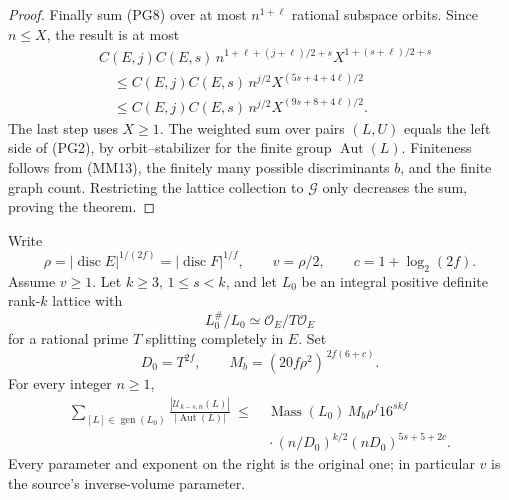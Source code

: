 \begin{proof}
Finally sum (PG8) over at most \(n^{1+\ell}\) rational
subspace orbits.  Since \(n\leq X\), the result is at most
\[
 \begin{split}
 &C(E,j)C(E,s)\,
     n^{1+\ell+(j+\ell)/2+s}
     X^{1+(s+\ell)/2+s}\\
 &\quad\leq C(E,j)C(E,s)\,
               n^{j/2}X^{(5s+4+4\ell)/2}\\
 &\quad\leq C(E,j)C(E,s)\,
               n^{j/2}X^{(9s+8+4\ell)/2}.
 \end{split}
 \tag{PG10}
\]
The last step uses \(X\geq1\).  The weighted sum over pairs
\((L,U)\) equals the left side of (PG2), by orbit--stabilizer
for the finite group \(\operatorname{Aut}(L)\).
Finiteness follows from (MM13), the finitely many possible
discriminants \(b\), and the finite graph count.  Restricting
the lattice collection to \(\mathcal G\) only decreases the
sum, proving the theorem.
\end{proof}

\begin{theorem}
\label{thm:normalized-primitive-sublattice-genus-mean}
Write
\[
 \rho=|\operatorname{disc}E|^{1/(2f)}
      =|\operatorname{disc}F|^{1/f},\qquad
 v=\rho/2,\qquad c=1+\log_2(2f).
 \tag{PG11}
\]
Assume \(v\geq1\).  Let \(k\geq3\), \(1\leq s<k\), and let
\(L_0\) be an integral positive definite rank-\(k\) lattice with
\[
 L_0^\#/L_0\simeq\mathcal O_E/T\mathcal O_E
\]
for a rational prime \(T\) splitting completely in \(E\).  Set
\[
 D_0=T^{2f},\qquad
 M_b=(20f\rho^2)^{\,2f(6+c)}.
 \tag{PG12}
\]
For every integer \(n\geq1\),
\[
 \begin{split}
 \sum_{[L]\in\operatorname{gen}(L_0)}
       \frac{|\mathcal U_{k-s,n}(L)|}{|\operatorname{Aut}(L)|}
 \ \leq\ &
 \operatorname{Mass}(L_0)\,
 M_b\rho^f16^{skf}\\
 &{}\cdot(n/D_0)^{k/2}
                   (nD_0)^{5s+5+2c}.
 \end{split}
 \tag{PG13}
\]
Every parameter and exponent on the right is the original one;
in particular \(v\) is the source's inverse-volume parameter.
\end{theorem}

